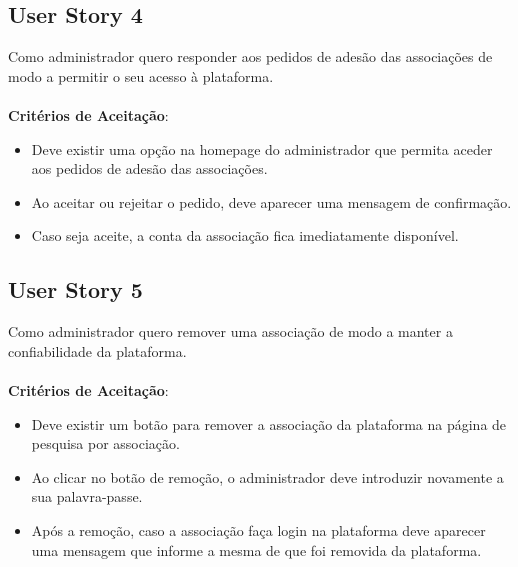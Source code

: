 \documentclass[a4paper,11pt]{article}
\begin{document}
\subsection*{User Story 4}
Como administrador quero responder aos pedidos de adesão das associações de modo a permitir o seu acesso à plataforma.\\\\
\textbf{Critérios de Aceitação}:
\begin{itemize}
  \item Deve existir uma opção na homepage do administrador que permita aceder aos pedidos de adesão das associações.
  \item Ao aceitar ou rejeitar o pedido, deve aparecer uma mensagem de confirmação.
  \item Caso seja aceite, a conta da associação fica imediatamente disponível.
\end{itemize}

\subsection*{User Story 5}
Como administrador quero remover uma associação de modo a manter a confiabilidade da plataforma.\\\\
\textbf{Critérios de Aceitação}:
\begin{itemize}
  \item Deve existir um botão para remover a associação da plataforma na página de pesquisa por associação.
  \item Ao clicar no botão de remoção, o administrador deve introduzir novamente a sua palavra-passe.
  \item Após a remoção, caso a associação faça login na plataforma deve aparecer uma mensagem que informe a mesma de que foi removida da plataforma.
\end{itemize}
\end{document}
